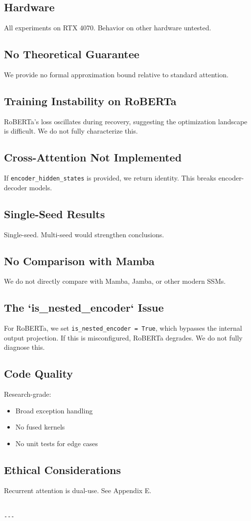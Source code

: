 \subsection{Hardware}

All experiments on RTX 4070. Behavior on other hardware untested.

\subsection{No Theoretical Guarantee}

We provide no formal approximation bound relative to standard attention.

\subsection{Training Instability on RoBERTa}

RoBERTa's loss oscillates during recovery, suggesting the optimization 
landscape is difficult. We do not fully characterize this.

\subsection{Cross-Attention Not Implemented}

If \texttt{encoder\_hidden\_states} is provided, we return identity. This breaks 
encoder-decoder models.

\subsection{Single-Seed Results}

Single-seed. Multi-seed would strengthen conclusions.

\subsection{No Comparison with Mamba}

We do not directly compare with Mamba, Jamba, or other modern SSMs.

\subsection{The `is\_nested\_encoder` Issue}

For RoBERTa, we set \texttt{is\_nested\_encoder = True}, which bypasses the internal 
output projection. If this is misconfigured, RoBERTa degrades. We do not 
fully diagnose this.

\subsection{Code Quality}

Research-grade:
\begin{itemize}
\item Broad exception handling
\item No fused kernels
\item No unit tests for edge cases

\end{itemize}
\subsection{Ethical Considerations}

Recurrent attention is dual-use. See Appendix E.
\begin{lstlisting}

---
\end{lstlisting}